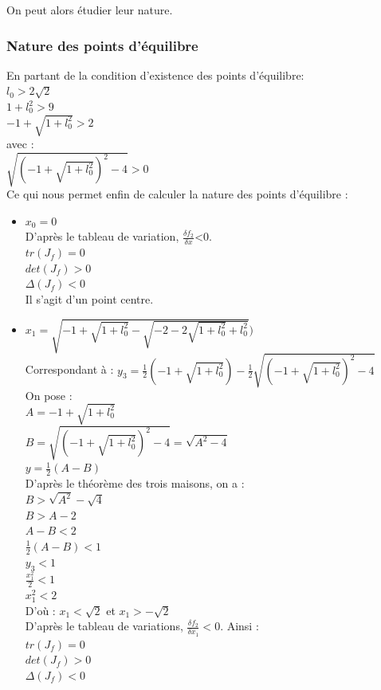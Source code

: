 \documentclass[10pt,a4paper]{article}
\begin{document}
On peut alors étudier leur nature.\\
\subsubsection*{Nature des points d'équilibre}
En partant de la condition d'existence des points d'équilibre:\\
$l_0>2\sqrt{2}$\\
$1+l_0^2>9$\\
$-1+\sqrt{1+l_0^2}>2$\\
avec :\\
$\sqrt{(-1+\sqrt{1+l_0^2})^2-4}>0$\\
Ce qui nous permet enfin de calculer la nature des points d'équilibre :
\begin{itemize}
\item $x_0=0$\\
D'après le tableau de variation, $\frac{\delta f_2}{\delta x}$<0.\\
$tr(J_f) = 0 $\\
$det(J_f) > 0 $\\
$\Delta(J_f) < 0$\\
Il s'agit d'un point centre.
\item $x_1=\sqrt{-1+\sqrt{1+l_0^2}-\sqrt{-2-2\sqrt{1+l_0^2}+l_0^2}})$\\
Correspondant à : $y_3=\frac{1}{2}(-1+\sqrt{1+l_0^2})-\frac{1}{2}\sqrt{(-1+\sqrt{1+l_0^2})^2-4}$\\
On pose :\\
$A=-1+\sqrt{1+l_0^2}$\\
$B=\sqrt{(-1+\sqrt{1+l_0^2})^2-4} = \sqrt{A^2-4}$\\
$y=\frac{1}{2}(A-B)$\\
D'après le théorème des trois maisons, on a :\\
$B > \sqrt{A^2} - \sqrt{4}$\\
$B > A - 2$\\
$A-B < 2$\\
$\frac{1}{2}(A-B)<1$\\
$y_3 < 1$\\
$\frac{x_1^2}{2}<1$\\
$x_1^2<2$\\
D'où :
$x_1<\sqrt{2}$ et $x_1>-\sqrt{2}$\\
D'après le tableau de variations, $\frac{\delta f_2}{\delta x_1}<0$. Ainsi :\\
$tr(J_f) = 0 $\\
$det(J_f) > 0 $\\
$\Delta(J_f) < 0$\\

\end{itemize}
\end{document}
